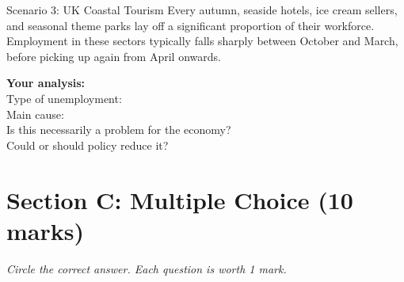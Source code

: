 \documentclass[12pt,a4paper]{article}
\begin{document}
\vspace{1em}

\begin{scenario}{Scenario 3: UK Coastal Tourism}
    Every autumn, seaside hotels, ice cream sellers, and seasonal theme parks lay off a significant proportion of their workforce. Employment in these sectors typically falls sharply between October and March, before picking up again from April onwards.
\end{scenario}

\vspace{0.5em}
\textbf{Your analysis:}\\
Type of unemployment: \dotfill \\[0.4em]
Main cause: \dotfill \\[0.4em]
Is this necessarily a problem for the economy? \dotfill \\[0.4em]
Could or should policy reduce it? \dotfill

\newpage

\section*{Section C: Multiple Choice (10 marks)}

\textit{Circle the correct answer. Each question is worth 1 mark.}

\vspace{0.5em}
\end{document}
